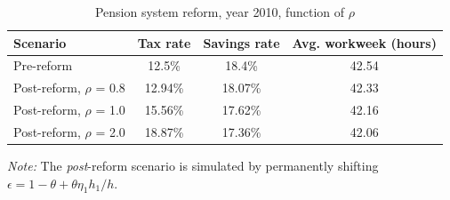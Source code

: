 \begin{table}[!htb]
\centering
\begin{threeparttable}
\caption{Pension system reform, year 2010, function of $\rho$}
\label{table:Argentina:funcOfRho}
\begin{tabular}{lccc}
\toprule
\textbf{Scenario} & \textbf{Tax rate} & \textbf{Savings rate} & \textbf{Avg. workweek (hours)}\\
\midrule 
Pre-reform & 12.5\% & 18.4\% & 42.54 \\[1ex]
Post-reform, $\rho$ = 0.8 & 12.94\% & 18.07\% & 42.33 \\[1ex]
Post-reform, $\rho$ = 1.0 & 15.56\% & 17.62\% & 42.16 \\[1ex]
Post-reform, $\rho$ = 2.0 & 18.87\% & 17.36\% & 42.06 \\[1ex]
\bottomrule
\end{tabular}
\begin{tablenotes}
\footnotesize
\item\textit{Note:} The \textit{post}-reform scenario is simulated by permanently shifting $\epsilon = 1-\theta + \theta \eta_1 h_1 / h$.   
\end{tablenotes}
\end{threeparttable}
\end{table}

